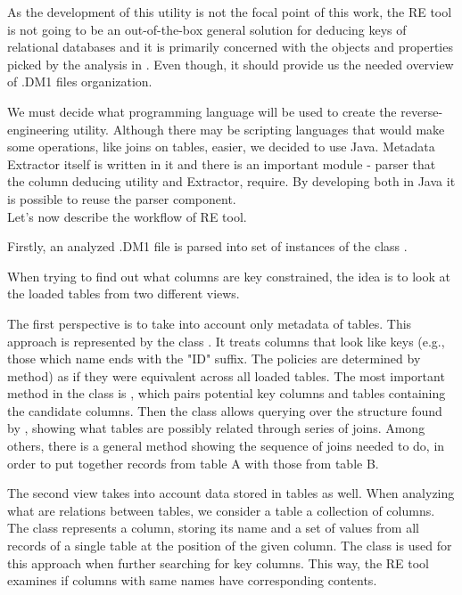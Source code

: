 As the development of this utility is not the focal point of this work, the RE tool is not going to be an out-of-the-box general solution for deducing keys of relational databases and it is primarily concerned with the objects and properties picked by the analysis in . Even though, it should provide us the needed overview of .DM1 files organization.

We must decide what programming language will be used to create the reverse-engineering utility. Although there may be scripting languages that would make some operations, like joins on tables, easier, we decided to use Java. Metadata Extractor itself is written in it and there is an important module - parser that the column deducing utility and Extractor, require. By developing both in Java it is possible to reuse the parser component. \\

Let's now describe the workflow of RE tool.

Firstly, an analyzed .DM1 file is parsed into set of instances of the class .

When trying to find out what columns are key constrained, the idea is to look at the loaded tables from two different views.

The first perspective is to take into account only metadata of tables. 
This approach is represented by the class . 
It treats columns that look like keys (e.g., those which name ends with the "ID" suffix. The policies are determined by  method) as if they were equivalent across all loaded tables.
The most important method in the class is , which pairs potential key columns and tables containing the candidate columns.
Then the class  allows querying over the structure found by , showing what tables are possibly related through series of joins.
Among others, there is a general method  showing the sequence of joins needed to do, in order to put together records from table A with those from table B.

The second view takes into account data stored in tables as well. 
When analyzing what are relations between tables, we consider a table a collection of columns. The  class represents a column, storing its name and a set of values from all records of a single table at the position of the given column.
The  class is used for this approach when further searching for key columns.
This way, the RE tool examines if columns with same names have corresponding contents.


